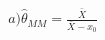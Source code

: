 \documentclass[preview]{standalone}
\begin{document}
\begin{align*}
a) \hat{\theta}_{MM} = \frac{\bar{X}}{\bar{X} - x_0}
\end{align*}
\end{document}
